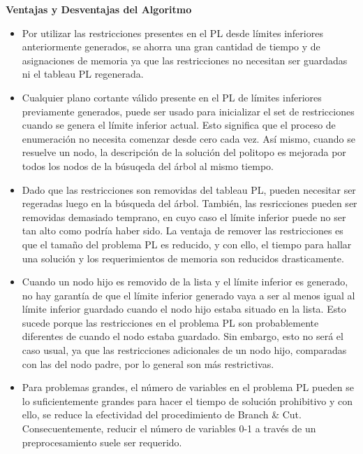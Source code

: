\documentclass[a4paper]{article}
\begin{document}
\textbf{Ventajas y Desventajas del Algoritmo}

\begin{itemize}
	\item Por utilizar las restricciones presentes en el PL desde límites inferiores anteriormente generados, se ahorra una gran cantidad de tiempo y de asignaciones de memoria ya que las restricciones no necesitan ser guardadas ni el tableau PL regenerada.
	
	\item Cualquier plano cortante válido presente en el PL de límites inferiores previamente generados, puede ser usado para inicializar el set de restricciones cuando se genera el límite inferior actual. Esto significa que el proceso de enumeración no necesita comenzar desde cero cada vez. Así mismo, cuando se resuelve un nodo, la descripción de la solución del politopo es mejorada por todos los nodos de la búsuqeda del árbol al mismo tiempo.
	
	\item Dado que las restricciones son removidas del tableau PL, pueden necesitar ser regeradas luego en la búsqueda del árbol. También, las resricciones pueden ser removidas demasiado temprano, en cuyo caso el límite inferior puede no ser tan alto como podría haber sido. La ventaja de remover las restricciones es que el tamaño del problema PL es reducido, y con ello, el tiempo para hallar una solución y los requerimientos de memoria son reducidos drasticamente.
	
	\item Cuando un nodo hijo es removido de la lista y el límite inferior es generado, no hay garantía de que el límite inferior generado vaya a ser al menos igual al límite inferior guardado cuando el nodo hijo estaba situado en la lista. Esto sucede porque las restricciones en el problema PL son probablemente diferentes de cuando el nodo estaba guardado. Sin embargo, esto no será el caso usual, ya que las restricciones adicionales de un nodo hijo, comparadas con las del nodo padre, por lo general son más restrictivas.
	
	\item Para problemas grandes, el número de variables en el problema PL pueden se lo suficientemente grandes para hacer el tiempo de solución prohibitivo y con ello, se reduce la efectividad del procedimiento de Branch \& Cut. Consecuentemente, reducir el número de variables 0-1 a través de un preprocesamiento suele ser requerido. 

\end{itemize}
\end{document}
